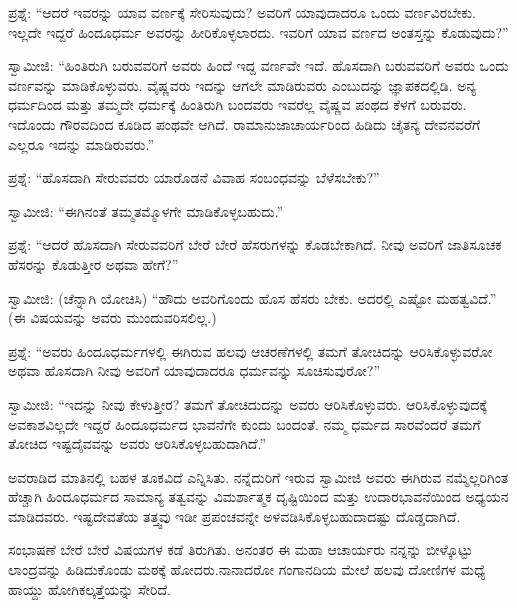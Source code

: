 ಪ್ರಶ್ನೆ: “ಆದರೆ ಇವರನ್ನು ಯಾವ ವರ್ಣಕ್ಕೆ ಸೇರಿಸುವುದು? ಅವರಿಗೆ ಯಾವುದಾದರೂ ಒಂದು ವರ್ಣವಿರಬೇಕು. ಇಲ್ಲದೇ ಇದ್ದರೆ ಹಿಂದೂಧರ್ಮ ಅವರನ್ನು ಹೀರಿಕೊಳ್ಳಲಾರದು. ಇವರಿಗೆ ಯಾವ ವರ್ಣದ ಅಂತಸ್ತನ್ನು ಕೊಡುವುದು?”

ಸ್ವಾಮೀಜಿ: “ಹಿಂತಿರುಗಿ ಬರುವವರಿಗೆ ಅವರು ಹಿಂದೆ ಇದ್ದ ವರ್ಣವೇ ಇದೆ. ಹೊಸದಾಗಿ ಬರುವವರಿಗೆ ಅವರು ಒಂದು ವರ್ಣವನ್ನು ಮಾಡಿಕೊಳ್ಳುವರು. ವೈಷ್ಣವರು ಇದನ್ನು ಆಗಲೇ ಮಾಡಿರುವರು ಎಂಬುದನ್ನು ಜ್ಞಾಪಕದಲ್ಲಿಡಿ. ಅನ್ಯ ಧರ್ಮದಿಂದ ಮತ್ತು ತಮ್ಮದೇ ಧರ್ಮಕ್ಕೆ ಹಿಂತಿರುಗಿ ಬಂದವರು ಇವರೆಲ್ಲ ವೈಷ್ಣವ ಪಂಥದ ಕೆಳಗೆ ಬರುವರು. ಇದೊಂದು ಗೌರವದಿಂದ ಕೂಡಿದ ಪಂಥವೇ ಆಗಿದೆ. ರಾಮಾನುಜಾಚಾರ್ಯರಿಂದ ಹಿಡಿದು ಚೈತನ್ಯ ದೇವನವರೆಗೆ ಎಲ್ಲರೂ ಇದನ್ನು ಮಾಡಿರುವರು.”

ಪ್ರಶ್ನೆ: “ಹೊಸದಾಗಿ ಸೇರುವವರು ಯಾರೊಡನೆ ವಿವಾಹ ಸಂಬಂಧವನ್ನು ಬೆಳೆಸಬೇಕು?”

ಸ್ವಾಮೀಜಿ: “ಈಗಿನಂತೆ ತಮ್ಮತಮ್ಮೊಳಗೇ ಮಾಡಿಕೊಳ್ಳಬಹುದು.”

\eject

ಪ್ರಶ್ನೆ: “ಆದರೆ ಹೊಸದಾಗಿ ಸೇರುವವರಿಗೆ ಬೇರೆ ಬೇರೆ ಹೆಸರುಗಳನ್ನು ಕೊಡಬೇಕಾಗಿದೆ. ನೀವು ಅವರಿಗೆ ಜಾತಿಸೂಚಕ ಹೆಸರನ್ನು ಕೊಡುತ್ತೀರ ಅಥವಾ ಹೇಗೆ?”

\vskip 3pt

ಸ್ವಾಮೀಜಿ: (ಚೆನ್ನಾಗಿ ಯೋಚಿಸಿ) “ಹೌದು ಅವರಿಗೊಂದು ಹೊಸ ಹೆಸರು ಬೇಕು. ಅದರಲ್ಲಿ ಎಷ್ಟೋ ಮಹತ್ವವಿದೆ.” (ಈ ವಿಷಯವನ್ನು ಅವರು ಮುಂದುವರಿಸಲಿಲ್ಲ.)

\vskip 3pt

ಪ್ರಶ್ನೆ: “ಅವರು ಹಿಂದೂಧರ್ಮಗಳಲ್ಲಿ ಈಗಿರುವ ಹಲವು ಆಚರಣೆಗಳಲ್ಲಿ ತಮಗೆ ತೋಚಿದನ್ನು ಆರಿಸಿಕೊಳ್ಳುವರೋ ಅಥವಾ ಹೊಸದಾಗಿ ನೀವು ಅವರಿಗೆ ಯಾವುದಾದರೂ ಧರ್ಮವನ್ನು ಸೂಚಿಸುವುರೋ?”

\vskip 3pt

ಸ್ವಾಮೀಜಿ: “ಇದನ್ನು ನೀವು ಕೇಳುತ್ತೀರ? ತಮಗೆ ತೋಚಿದುದನ್ನು ಅವರು ಆರಿಸಿಕೊಳ್ಳುವರು. ಆರಿಸಿಕೊಳ್ಳುವುದಕ್ಕೆ ಅವಕಾಶವಿಲ್ಲದೇ ಇದ್ದರೆ ಹಿಂದೂಧರ್ಮದ ಭಾವನೆಗೇ ಕುಂದು ಬಂದಂತೆ. ನಮ್ಮ ಧರ್ಮದ ಸಾರವೆಂದರೆ ತಮಗೆ ತೋಚಿದ ಇಷ್ಟದೈವವನ್ನು ಅವರು ಆರಿಸಿಕೊಳ್ಳಬಹುದಾಗಿದೆ.”

\vskip 3pt

ಅವರಾಡಿದ ಮಾತಿನಲ್ಲಿ ಬಹಳ ತೂಕವಿದೆ ಎನ್ನಿಸಿತು. ನನ್ನೆದುರಿಗೆ ಇರುವ ಸ್ವಾಮೀಜಿ ಅವರು ಈಗಿರುವ ನಮ್ಮೆಲ್ಲರಿಗಿಂತ ಹೆಚ್ಚಾಗಿ ಹಿಂದೂಧರ್ಮದ ಸಾಮಾನ್ಯ ತತ್ವವನ್ನು ವಿಮರ್ಶಾತ್ಮಕ ದೃಷ್ಟಿಯಿಂದ ಮತ್ತು ಉದಾರಭಾವನೆಯಿಂದ ಅಧ್ಯಯನ ಮಾಡಿದವರು. ಇಷ್ಟದೇವತೆಯ ತತ್ತ್ವವು ಇಡೀ ಪ್ರಪಂಚವನ್ನೇ ಅಳವಡಿಸಿಕೊಳ್ಳಬಹುದಾದಷ್ಟು ದೊಡ್ಡದಾಗಿದೆ.

\vskip 3pt

ಸಂಭಾಷಣೆ ಬೇರೆ ಬೇರೆ ವಿಷಯಗಳ ಕಡೆ ತಿರುಗಿತು. ಅನಂತರ ಈ ಮಹಾ ಆಚಾರ್ಯರು ನನ್ನನ್ನು ಬೀಳ್ಕೊಟ್ಟು ಲಾಂದ್ರವನ್ನು ಹಿಡಿದುಕೊಂಡು ಮಠಕ್ಕೆ ಹೋದರು.\break ನಾನಾದರೋ ಗಂಗಾನದಿಯ ಮೇಲೆ ಹಲವು ದೋಣಿಗಳ ಮಧ್ಯೆ ಹಾಯ್ದು ಹೋಗಿ\break ಕಲ್ಕತ್ತೆಯನ್ನು ಸೇರಿದೆ.

